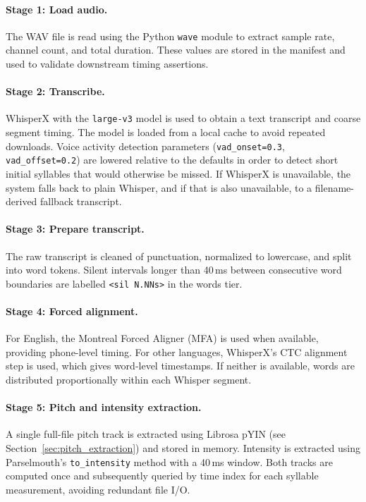 \paragraph{Stage 1: Load audio.}
The WAV file is read using the Python \texttt{wave} module to extract sample
rate, channel count, and total duration. These values are stored in the manifest
and used to validate downstream timing assertions.

\paragraph{Stage 2: Transcribe.}
WhisperX with the \texttt{large-v3} model is used to obtain a text transcript
and coarse segment timing. The model is loaded from a local cache to avoid
repeated downloads. Voice activity detection parameters
(\texttt{vad\_onset=0.3}, \texttt{vad\_offset=0.2}) are lowered relative to the
defaults in order to detect short initial syllables that would otherwise be
missed. If WhisperX is unavailable, the system falls back to plain Whisper, and
if that is also unavailable, to a filename-derived fallback transcript.

\paragraph{Stage 3: Prepare transcript.}
The raw transcript is cleaned of punctuation, normalized to lowercase, and split
into word tokens. Silent intervals longer than 40\,ms between consecutive word
boundaries are labelled \texttt{<sil N.NNs>} in the words tier.

\paragraph{Stage 4: Forced alignment.}
For English, the Montreal Forced Aligner (MFA) is used when available, providing
phone-level timing. For other languages, WhisperX's CTC alignment step is used,
which gives word-level timestamps. If neither is available, words are distributed
proportionally within each Whisper segment.

\paragraph{Stage 5: Pitch and intensity extraction.}
A single full-file pitch track is extracted using Librosa pYIN (see
Section~\ref{sec:pitch_extraction}) and stored in memory. Intensity is extracted
using Parselmouth's \texttt{to\_intensity} method with a 40\,ms window. Both
tracks are computed once and subsequently queried by time index for each syllable
measurement, avoiding redundant file I/O.

